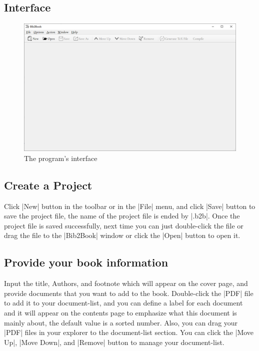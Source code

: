 \documentclass{article}
\begin{document}
    \subsection{Interface}
    \begin{figure}[htb]
        \centering
        \includegraphics[width=\textwidth]{figures/interface.png}
        \caption{The program's interface}
        \label{fig:interface}
    \end{figure}

    \subsection{Create a Project}

    Click |New| button in the toolbar or in the |File| menu, and click |Save| button to save the project file, the name of the project file is ended by |.b2b|. Once the project file is saved successfully, next time you can just double-click the file or drag the file to the |Bib2Book| window or click the |Open| button to open it.

    \subsection{Provide your book information}
    Input the title, Authors, and footnote which will appear on the cover page, and provide documents that you want to add to the book. Double-click the |PDF| file to add it to your document-list, and you can define a label for each document and it will appear on the contents page to emphasize what this document is mainly about, the default value is a sorted number. Also, you can drag your |PDF| files in your explorer to the document-list section. You can click the |Move Up|, |Move Down|, and |Remove| button to manage your document-list.
\end{document}
